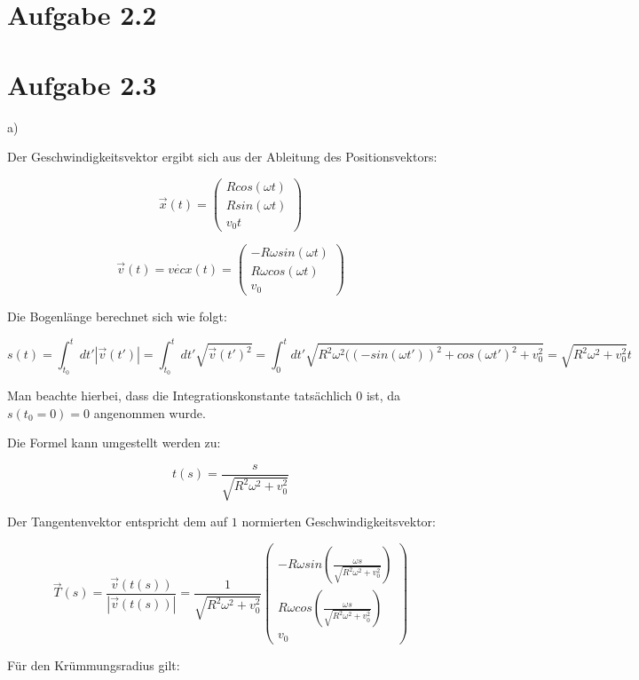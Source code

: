 \documentclass{theozettel}
\begin{document}
\newpage
\section*{Aufgabe 2.2}


\newpage
\section*{Aufgabe 2.3}

a)

Der Geschwindigkeitsvektor ergibt sich aus der Ableitung des Positionsvektors:

$$
\vec{x}(t) = \begin{pmatrix}
R cos(\omega t) \\
R sin(\omega t) \\
v_0 t
\end{pmatrix}
$$

$$
\vec{v	}(t) = \dot{vec{x}}(t) = \begin{pmatrix}
- R \omega sin(\omega t) \\
R \omega cos(\omega t) \\
v_0
\end{pmatrix}
$$

Die Bogenlänge berechnet sich wie folgt:

$$
s(t) =  \int_{t_0}^{t} d t' | \vec{v}(t') | = \int_{t_0}^{t} d t' \sqrt{\vec{v}(t')^{2}} = \int_{0}^{t} d t' \sqrt{R^{2}\omega^{2} ((-sin(\omega t'))^{2} + cos(\omega t')^{2} + v_0^{2}} = \sqrt{R^{2} \omega^{2} + v_0^{2}} t
$$

Man beachte hierbei, dass die Integrationskonstante tatsächlich $0$ ist, da $s(t_0 = 0) = 0$ angenommen wurde.

Die Formel kann umgestellt werden zu:

$$
t(s) = \frac{s}{\sqrt{R^{2} \omega^{2} + v_0^{2}}}
$$

Der Tangentenvektor entspricht dem auf $1$ normierten Geschwindigkeitsvektor:

$$
\vec{T}(s) = \frac{\vec{v}(t(s))}{|\vec{v}(t(s))|} = \frac{1}{\sqrt{R^{2} \omega^{2} + v_0^{2}}} \begin{pmatrix}
- R \omega sin(\frac{\omega s}{\sqrt{R^{2} \omega^{2} + v_0^{2}}}) \\
R \omega cos(\frac{\omega s}{\sqrt{R^{2} \omega^{2} + v_0^{2}}}) \\
v_0
\end{pmatrix}
$$

Für den Krümmungsradius gilt:
\end{document}

